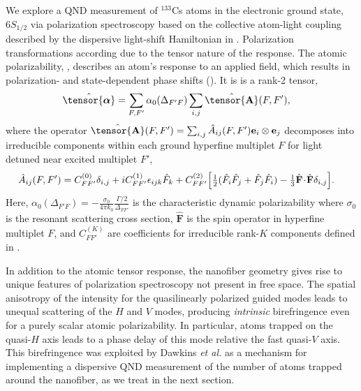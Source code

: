 \documentclass[preprint, aps,pra,onecolumn]{revtex4-1} %
\newcommand{\poltens}{\hat{\tensor{\boldsymbol{\alpha}}}}
\newcommand{\charpol}{\alpha_0(\Delta_{F'F})}
\begin{document}
We explore a QND measurement of ${}^{133}$Cs atoms in the electronic ground state, $6S_{1/2}$ via polarization spectroscopy based on the collective atom-light coupling described by the dispersive light-shift Hamiltonian in . Polarization transformations according due to the tensor nature of the response.  The atomic polarizability, , describes an atom's response to an applied field, which results in polarization- and state-dependent phase shifts ().  It is is a rank-2 tensor,
	\begin{align} \label{Eq::Polarizability}
		\poltens &=  \sum_{F,F'} \charpol \sum_{i,j} \hat{\tensor{\mbf{A}}}(F,F'),
	\end{align}
where the operator $\hat{\tensor{\mbf{A}}}(F,F') = \sum_{i,j} \hat{A}_{ij}(F,F')\mathbf{e}_i \otimes \mathbf{e}_j$ decomposes into irreducible components within each ground hyperfine multiplet $F$ for light detuned near excited multiplet $F'$,  
	\begin{align} \label{Eq::PolarizabilityIrrep}
		\hat{A}_{ij}(F,F')&=  C_{FF'}^{(0)} \delta_{i,j}+ iC_{FF'}^{(1)}\epsilon_{ijk}\hat{F}_k+ C_{FF'}^{(2)} \Big[ \mbox{$\frac{1}{2}$} ( \hat{F}_i\hat{F}_j +\hat{F}_j\hat{F}_i )-\mbox{$\frac{1}{3}$} \hat{\mathbf{F}}\!\cdot\!\hat{\mathbf{F}} \delta_{i,j} \Big]. 
\end{align}
Here, $\charpol = -\frac{\sigma_0}{4\pi k_0}\frac{\Gamma/2 }{\Delta_{FF'}}$ is the characteristic dynamic polarizability where $\sigma_0$ is the resonant scattering cross section, $\hat{\mathbf{F}}$ is the spin operator in hyperfine multiplet $F$, and $C_{FF'}^{(K)}$ are coefficients for irreducible rank-$K$ components defined in \cite{deutsch_quantum_2010}. 

In addition to the atomic tensor response, the nanofiber geometry gives rise to unique features of polarization spectroscopy not present in free space.  The spatial anisotropy of the intensity for the quasilinearly polarized guided modes leads to unequal scattering of the $H$ and $V$ modes, producing \emph{intrinsic} birefringence even for a purely scalar atomic polarizability.  
In particular, atoms trapped on the quasi-$H$ axis leads to a phase delay of this mode relative the fast quasi-$V$ axis. 
This birefringence was exploited by Dawkins {\em et al.} \cite{dawkins_dispersive_2011} as a mechanism for implementing a dispersive QND measurement of the number of atoms trapped around the nanofiber, as we treat in the next section. 
\end{document}
